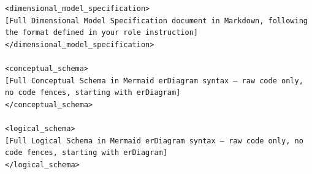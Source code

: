 \begin{verbatim}
<dimensional_model_specification>
[Full Dimensional Model Specification document in Markdown, following the format defined in your role instruction]
</dimensional_model_specification>

<conceptual_schema>
[Full Conceptual Schema in Mermaid erDiagram syntax — raw code only, no code fences, starting with erDiagram]
</conceptual_schema>

<logical_schema>
[Full Logical Schema in Mermaid erDiagram syntax — raw code only, no code fences, starting with erDiagram]
</logical_schema>
\end{verbatim}
